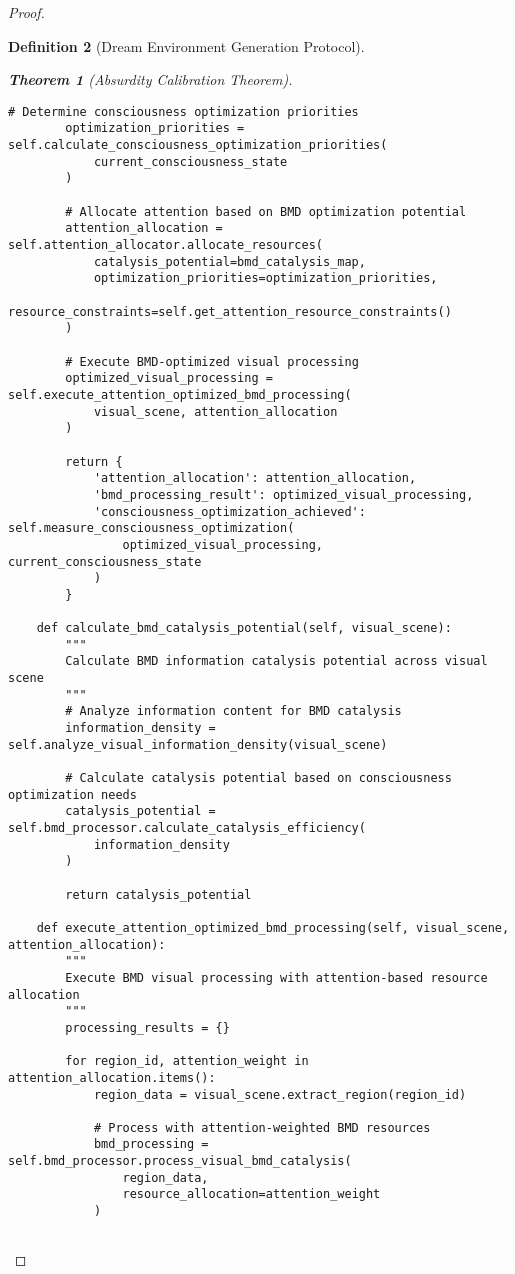 \documentclass[12pt,a4paper]{article}
\newtheorem{theorem}{Theorem}[section]
\newtheorem{definition}[theorem]{Definition}
\begin{document}
\begin{proof}
\begin{definition}[Dream Environment Generation Protocol]
\begin{theorem}[Absurdity Calibration Theorem]
\begin{lstlisting}[style=pythonstyle, caption=Visual Attention BMD Resource Allocation]
        # Determine consciousness optimization priorities
        optimization_priorities = self.calculate_consciousness_optimization_priorities(
            current_consciousness_state
        )
        
        # Allocate attention based on BMD optimization potential
        attention_allocation = self.attention_allocator.allocate_resources(
            catalysis_potential=bmd_catalysis_map,
            optimization_priorities=optimization_priorities,
            resource_constraints=self.get_attention_resource_constraints()
        )
        
        # Execute BMD-optimized visual processing
        optimized_visual_processing = self.execute_attention_optimized_bmd_processing(
            visual_scene, attention_allocation
        )
        
        return {
            'attention_allocation': attention_allocation,
            'bmd_processing_result': optimized_visual_processing,
            'consciousness_optimization_achieved': self.measure_consciousness_optimization(
                optimized_visual_processing, current_consciousness_state
            )
        }
    
    def calculate_bmd_catalysis_potential(self, visual_scene):
        """
        Calculate BMD information catalysis potential across visual scene
        """
        # Analyze information content for BMD catalysis
        information_density = self.analyze_visual_information_density(visual_scene)
        
        # Calculate catalysis potential based on consciousness optimization needs
        catalysis_potential = self.bmd_processor.calculate_catalysis_efficiency(
            information_density
        )
        
        return catalysis_potential
    
    def execute_attention_optimized_bmd_processing(self, visual_scene, attention_allocation):
        """
        Execute BMD visual processing with attention-based resource allocation
        """
        processing_results = {}
        
        for region_id, attention_weight in attention_allocation.items():
            region_data = visual_scene.extract_region(region_id)
            
            # Process with attention-weighted BMD resources
            bmd_processing = self.bmd_processor.process_visual_bmd_catalysis(
                region_data,
                resource_allocation=attention_weight
            )
            

\end{lstlisting}
\end{theorem}
\end{definition}
\end{proof}
\end{document}
